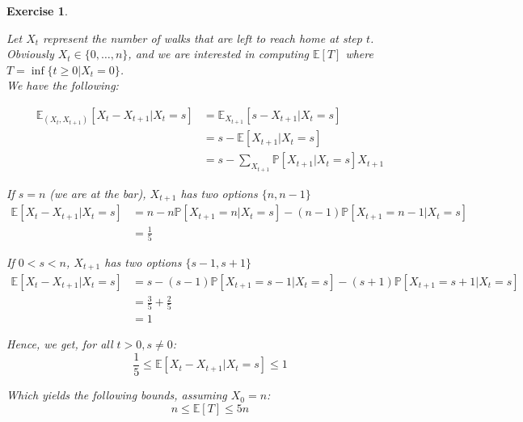\documentclass{article}
\newtheorem{exo}{Exercise}
\def\P{\mathbb{P}}
\def\E{\mathbb{E}}
\begin{document}
\begin{exo}{\ \\}

Let $X_t$ represent the number of walks that are left to reach home at step $t$. Obviously $X_t \in \{0, \dots, n\}$, and we are interested in computing $\E[T]$ where $T = \inf\{t \geq 0 | X_t = 0 \}$. \\

We have the following:

\begin{align*}
    \E_{(X_t,X_{t+1})}[X_t - X_{t+1}| X_t=s]  
    &= \E_{X_{t+1}}[s- X_{t+1}| X_t=s]  \\
    &= s - \E[X_{t+1}| X_t=s]  \\
    &= s - \sum_{X_{t+1}} \P[X_{t+1}|X_t=s]X_{t+1}
\end{align*}

If $s=n$ (we are at the bar), $X_{t+1}$ has two options $\{n, n-1\}$
\begin{align*}
    \E[X_t-X_{t+1} | X_t = s] 
    &= n - n\P[X_{t+1}= n|X_t=s] - (n-1)\P[X_{t+1}=n-1|X_t=s] \\
    &= \frac{1}{5}
\end{align*}


If $0<s<n$, $X_{t+1}$ has two options $\{s-1, s+1\}$
\begin{align*}
    \E[X_t-X_{t+1} | X_t = s] 
    &= s - (s-1)\P[X_{t+1}= s-1|X_t=s] - (s+1)\P[X_{t+1}=s+1|X_t=s] \\
    &= \frac{3}{5} + \frac{2}{5} \\
    &= 1
\end{align*}

Hence, we get, for all $t>0, s \neq 0$:
\[ \frac{1}{5} \leq \E[X_t-X_{t+1} | X_t = s]  \leq 1 \]

Which yields the following bounds, assuming $X_0 = n$:
\[ n \leq \E[T] \leq 5n \]
\end{exo}
\end{document}
